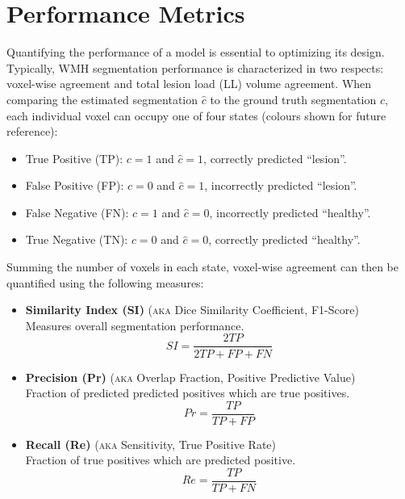 \section{Performance Metrics}\label{ss:metrics}
Quantifying the performance of a model is essential to optimizing its design.
Typically, WMH segmentation performance is characterized in two respects: voxel-wise agreement and total lesion load (LL) volume agreement.
When comparing the estimated segmentation $\hat{c}$ to the ground truth segmentation $c$, each individual voxel can occupy one of four states (colours shown for future reference):
\begin{itemize}[itemsep=0pt,topsep=0pt]
  \item[\textcolor{green}{\scalebox{0.7}{$\blacksquare$}}] True Positive (TP): $c = 1$ and $\hat{c} = 1$, correctly predicted ``lesion''.
  \item[\textcolor{red}  {\scalebox{0.7}{$\blacksquare$}}] False Positive (FP): $c = 0$ and $\hat{c} = 1$, incorrectly predicted ``lesion''.
  \item[\textcolor{blue} {\scalebox{0.7}{$\blacksquare$}}] False Negative (FN): $c = 1$ and $\hat{c} = 0$, incorrectly predicted ``healthy''.
  \item[\textcolor{black}{\scalebox{0.7}{$\blacksquare$}}] True Negative (TN): $c = 0$ and $\hat{c} = 0$, correctly predicted ``healthy''.
\end{itemize}
Summing the number of voxels in each state, voxel-wise agreement can then be quantified using the following measures:
\begin{itemize}
  \item \textbf{Similarity Index (SI)} (\textsc{aka} Dice Similarity Coefficient, F1-Score)\\Measures overall segmentation performance.
  \begin{equation}SI = \dfrac{2TP}{2TP + FP + FN}\end{equation}
  \item \textbf{Precision (Pr)} (\textsc{aka} Overlap Fraction, Positive Predictive Value)\\Fraction of predicted predicted positives which are true positives.
  \begin{equation}Pr = \dfrac{TP}{TP+FP}\end{equation}
  \item \textbf{Recall (Re)} (\textsc{aka} Sensitivity, True Positive Rate)\\Fraction of true positives which are predicted positive.
  \begin{equation}Re = \dfrac{TP}{TP+FN}\end{equation}
\end{itemize}
